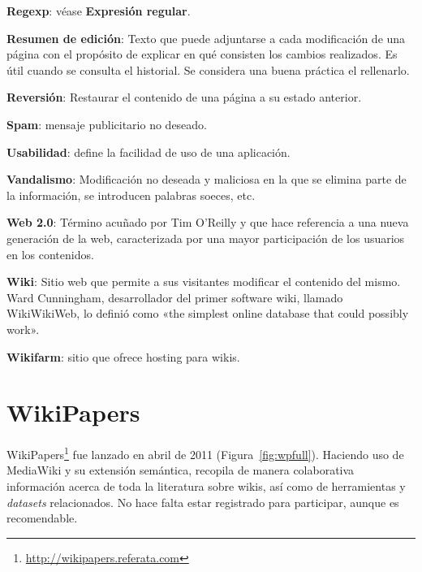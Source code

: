 \documentclass[11pt,onecolumn]{article}
\begin{document}
\textbf{Regexp}: véase \textbf{Expresión regular}.

\textbf{Resumen de edición}: Texto que puede adjuntarse a cada modificación de una página con el propósito de explicar en qué consisten los cambios realizados. Es útil cuando se consulta el historial. Se considera una buena práctica el rellenarlo.

\textbf{Reversión}: Restaurar el contenido de una página a su estado anterior.


\textbf{Spam}: mensaje publicitario no deseado.

\textbf{Usabilidad}: define la facilidad de uso de una aplicación.

\textbf{Vandalismo}: Modificación no deseada y maliciosa en la que se elimina parte de la información, se introducen palabras soeces, etc.

\textbf{Web 2.0}: Término acuñado por Tim O'Reilly y que hace referencia a una nueva generación de la web, caracterizada por una mayor participación de los usuarios en los contenidos.

\textbf{Wiki}: Sitio web que permite a sus visitantes modificar el contenido del mismo. Ward Cunningham, desarrollador del primer software wiki, llamado WikiWikiWeb, lo definió como «the simplest online database that could possibly work».

\textbf{Wikifarm}: sitio que ofrece hosting para wikis.

\clearpage

\section{WikiPapers}


WikiPapers\footnote{\href{http://wikipapers.referata.com}{http://wikipapers.referata.com}} fue lanzado en abril de 2011 (Figura~\ref{fig:wpfull}). Haciendo uso de MediaWiki y su extensión semántica, recopila de manera colaborativa información acerca de toda la literatura sobre wikis, así como de herramientas y \emph{datasets} relacionados. No hace falta estar registrado para participar, aunque es recomendable.
\end{document}
